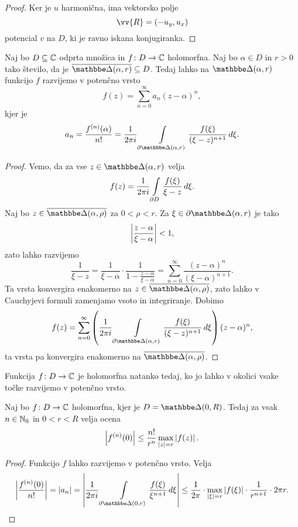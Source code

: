 \begin{proof}
Ker je $u$ harmonična, ima vektorsko polje
\[
\vv{R} = (-u_y, u_x)
\]
potencial $v$ na $D$, ki je ravno iskana konjugiranka.
\end{proof}

\begin{izrek}\label{iz:pow}
Naj bo $D \subseteq \mathbb{C}$ odprta množica in $f \colon D \to \mathbb{C}$
holomorfna. Naj bo $\alpha \in D$ in $r > 0$ tako število, da je
$\oline{\dsk(\alpha, r)} \subseteq D$. Tedaj lahko na
$\dsk(\alpha, r)$ funkcijo $f$ razvijemo v potenčno vrsto
\[
f(z) = \sum_{n=0}^\infty a_n (z - \alpha)^n,
\]
kjer je
\[
a_n = \frac{f^{(n)}(\alpha)}{n!} =
\frac{1}{2 \pi i} \lint_{\partial \dsk(\alpha, r)}
\frac{f(\xi)}{(\xi - z)^{n+1}}\,d\xi.
\]
\end{izrek}

\begin{proof}
Vemo, da za vse $z \in \dsk(\alpha, r)$ velja
\[
f(z) =
\frac{1}{2 \pi i} \int\limits_{\partial D} \frac{f(\xi)}{\xi - z}\,d\xi.
\]
Naj bo $z \in \oline{\dsk(\alpha, \rho)}$ za $0 < \rho < r$. Za
$\xi \in \partial \dsk(\alpha, r)$ je tako
\[
\left\lvert \frac{z - \alpha}{\xi - \alpha}\right\rvert < 1,
\]
zato lahko razvijemo
\[
\frac{1}{\xi - z} =
\frac{1}{\xi - \alpha} \cdot
\frac{1}{1  - \frac{z - \alpha}{\xi - \alpha}} =
\sum_{n=0}^\infty \frac{(z - \alpha)^n}{(\xi - \alpha)^{n+1}}.
\]
Ta vrsta konvergira enakomerno na
$z \in \oline{\dsk(\alpha, \rho)}$, zato lahko v Cauchyjevi formuli
zamenjamo vsoto in integriranje. Dobimo
\[
f(z) = \sum_{n=0}^\infty
\left(\frac{1}{2 \pi i} \lint_{\partial \dsk(\alpha, r)}
\frac{f(\xi)}{(\xi - z)^{n+1}}\,d\xi\right)(z - \alpha)^n,
\]
ta vrsta pa konvergira enakomerno na $\oline{\dsk(\alpha, \rho)}$.
\end{proof}

\begin{posledica}
Funkcija $f \colon D \to \mathbb{C}$ je holomorfna natanko tedaj, ko jo
lahko v okolici vsake točke razvijemo v potenčno vrsto.
\end{posledica}


\begin{trditev}
Naj bo $f \colon D \to \mathbb{C}$ holomorfna, kjer je $D = \dsk(0, R)$.
Tedaj za vsak $n \in \mathbb{N}_0$ in $0 < r < R$ velja ocena
\[
\left\lvert f^{(n)}(0)\right\rvert \leq \frac{n!}{r^n} \max_{\left\lvert z\right\rvert=r} \left\lvert f(z)\right\rvert.
\]
\end{trditev}

\begin{proof}
Funkcijo $f$ lahko razvijemo v potenčno vrsto. Velja
\[
\abs{\frac{f^{(n)}(0)}{n!}} = \abs{a_n} =
\abs{\frac{1}{2 \pi i}
\lint_{\partial \dsk(0, r)} \frac{f(\xi)}{\xi^{n+1}}\,d\xi} \leq
\frac{1}{2 \pi} \cdot \max_{\abs{\xi}=r} \abs{f(\xi)} \cdot
\frac{1}{r^{n+1}} \cdot 2 \pi r. \qedhere
\]
\end{proof}

